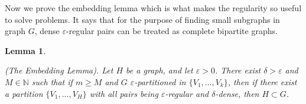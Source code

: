 \documentclass[12pt,twoside,a4paper]{book}
\numberwithin{equation}{section}
\newtheorem{lemma}     	[theorem] {Lemma}
\newtheorem{definition}	[theorem] {Definition}
\theoremstyle{remark}
\begin{document}
Now we prove the embedding lemma which is what makes the regularity so useful to solve problems. It says that for the purpose of finding small subgraphs in graph $G$, dense $\varepsilon$-regular pairs can be treated as complete bipartite graphs.


\begin{lemma}\label{lemma:embeddinglemma}


(The Embedding Lemma). Let $H$ be a graph, and let $\varepsilon >0$. There exist $\delta >\varepsilon$ and $M \in \mathbb{N}$ such that if $m \geq M$ and $G$ $\varepsilon$-partitioned in $\{V_1, ..., V_k\}$, then if there exist a partition $\{V_1, ..., V_H\}$ with all pairs being $\varepsilon$-regular and $\delta$-dense, then $H \subset G$. 
\end{lemma} 
\end{document}
